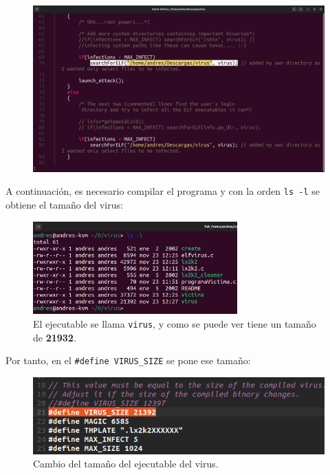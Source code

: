 \documentclass{article}
\begin{document}
\begin{figure}[H]
    \includegraphics[width=\textwidth]{imagenes/Captura desde 2022-11-25 17-29-47.png}
\end{figure}

\newpage

A continuación, es necesario compilar el programa y con la orden \verb|ls -l| se obtiene el tamaño del virus:

\begin{figure}[H]
    \centering
    \includegraphics[width=0.7\textwidth]{imagenes/Captura desde 2022-11-23 12-28-06.png}
    \caption{El ejecutable se llama \texttt{virus}, y como se puede ver tiene un tamaño de \textbf{21932}.}
\end{figure}

\bigskip

Por tanto, en el \verb|#define VIRUS_SIZE| se pone ese tamaño:

\begin{figure}[H]
    \includegraphics[width=\textwidth]{imagenes/Captura desde 2022-11-23 12-29-27.png}
    \caption{Cambio del tamaño del ejecutable del virus.}
\end{figure}
\end{document}
